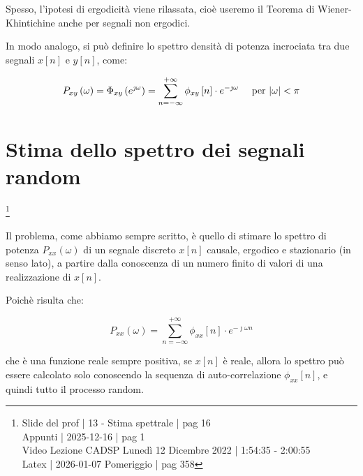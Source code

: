 Spesso, l'ipotesi di ergodicità viene rilassata, cioè useremo il Teorema di Wiener-Khintichine anche per segnali non ergodici. \newline 

In modo analogo, si può definire lo spettro densità di potenza incrociata tra due segnali $x \left[ n\right]$ e $y \left[ n\right]$, come: 

{
    \Large 
    \begin{equation}
        P_{xy} \left(\omega\right)
        = 
        \Phi_{xy} \left(e^{\jmath \omega}\right) 
        = 
        \sum_{n = - \infty}^{+ \infty}
        \phi_{xy} \left[ n\right]
        \cdot 
        e^{- \jmath \omega }
        \quad 
        \text{ per }
        \abs{\omega} < \pi
    \end{equation}
}

\newpage 

\section{Stima dello spettro dei segnali random} \label{sec: Stima dello spettro dei segnali random}

\footnote{ 
    Slide del prof | 13 - Stima spettrale | pag 16\\
    Appunti | 2025-12-16 | pag 1\\
    Video Lezione CADSP Lunedì 12 Dicembre 2022 | 1:54:35 - 2:00:55 \\
    Latex | 2026-01-07 Pomeriggio | pag 358
}

Il problema, come abbiamo sempre scritto, è quello di stimare lo spettro di potenza $P_{xx} \left(\omega\right)$ di un segnale discreto $x \left[ n\right]$ causale, ergodico e stazionario (in senso lato), 
a partire dalla conoscenza di un numero finito di valori di una realizzazione di $x \left[ n\right]$. \newline 

Poichè risulta che: 

{
    \Large 
    \begin{equation}
        P_{xx} \left(\omega\right)
        = 
        \sum_{n = - \infty}^{+ \infty}
        \phi_{xx} \left[ n\right]  \cdot e^{- \jmath \omega n}
    \end{equation}
}

che è una funzione reale sempre positiva, se $x \left[ n\right]$ è reale, allora lo spettro può essere calcolato solo conoscendo la sequenza di auto-correlazione $\phi_{xx} \left[ n\right]$, e quindi tutto il processo random. \newline 

